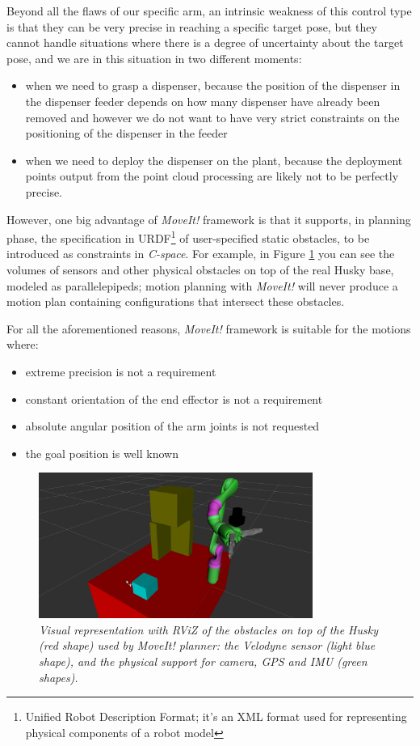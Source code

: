 Beyond all the flaws of our specific arm, an intrinsic weakness of this control type is that they can be very precise in reaching a specific target pose, but they cannot handle situations where there is a degree of uncertainty about the target pose, and we are in this situation in two different moments:
\begin{itemize}
	\item when we need to grasp a dispenser, because the position of the dispenser in the dispenser feeder depends on how many dispenser have already been removed and however we do not want to have very strict constraints on the positioning of the dispenser in the feeder
	\item when we need to deploy the dispenser on the plant, because the deployment points output from the point cloud processing are likely not to be perfectly precise.
\end{itemize}
However, one big advantage of \textit{MoveIt!} framework is that it supports, in planning phase, the specification in URDF\footnote{Unified Robot Description Format; it's an XML format used for representing physical components of a robot model}
of user-specified static obstacles, to be introduced as constraints in \textit{C-space}. For example, in Figure \ref{fig:moveItObstacles} you can see the volumes of sensors and other physical obstacles on top of the real Husky base, modeled as parallelepipeds; motion planning with \textit{MoveIt!} will never produce a motion plan containing configurations that intersect these obstacles.

For all the aforementioned reasons, \textit{MoveIt!} framework is suitable for the motions where:
\begin{itemize}
	\item extreme precision is not a requirement
	\item constant orientation of the end effector is not a requirement
	\item absolute angular position of the arm joints is not requested
	\item the goal position is well known
\end{itemize}


\begin{figure}
	\centering
	\includegraphics[width=0.8\textwidth]{Images/arm/kinova_prepare_rviz.png}
	\caption{\textit{Visual representation with RViZ of the obstacles on top of the Husky (red shape) used by MoveIt! planner: the Velodyne sensor (light blue shape), and the physical support for camera, \ac{GPS} and \ac{IMU} (green shapes).}}
	\label{fig:moveItObstacles}
\end{figure}


